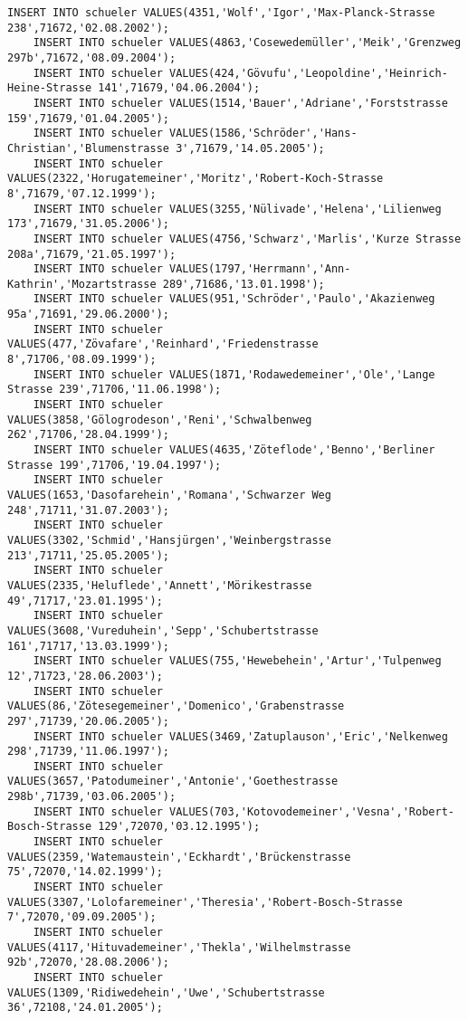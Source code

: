 \begin{lstlisting}[breaklines=True, numbers=none, basicstyle=\tiny, keepspaces=false]
	INSERT INTO schueler VALUES(4351,'Wolf','Igor','Max-Planck-Strasse 238',71672,'02.08.2002');
	INSERT INTO schueler VALUES(4863,'Cosewedemüller','Meik','Grenzweg 297b',71672,'08.09.2004');
	INSERT INTO schueler VALUES(424,'Gövufu','Leopoldine','Heinrich-Heine-Strasse 141',71679,'04.06.2004');
	INSERT INTO schueler VALUES(1514,'Bauer','Adriane','Forststrasse 159',71679,'01.04.2005');
	INSERT INTO schueler VALUES(1586,'Schröder','Hans-Christian','Blumenstrasse 3',71679,'14.05.2005');
	INSERT INTO schueler VALUES(2322,'Horugatemeiner','Moritz','Robert-Koch-Strasse 8',71679,'07.12.1999');
	INSERT INTO schueler VALUES(3255,'Nülivade','Helena','Lilienweg 173',71679,'31.05.2006');
	INSERT INTO schueler VALUES(4756,'Schwarz','Marlis','Kurze Strasse 208a',71679,'21.05.1997');
	INSERT INTO schueler VALUES(1797,'Herrmann','Ann-Kathrin','Mozartstrasse 289',71686,'13.01.1998');
	INSERT INTO schueler VALUES(951,'Schröder','Paulo','Akazienweg 95a',71691,'29.06.2000');
	INSERT INTO schueler VALUES(477,'Zövafare','Reinhard','Friedenstrasse 8',71706,'08.09.1999');
	INSERT INTO schueler VALUES(1871,'Rodawedemeiner','Ole','Lange Strasse 239',71706,'11.06.1998');
	INSERT INTO schueler VALUES(3858,'Gölogrodeson','Reni','Schwalbenweg 262',71706,'28.04.1999');
	INSERT INTO schueler VALUES(4635,'Zöteflode','Benno','Berliner Strasse 199',71706,'19.04.1997');
	INSERT INTO schueler VALUES(1653,'Dasofarehein','Romana','Schwarzer Weg 248',71711,'31.07.2003');
	INSERT INTO schueler VALUES(3302,'Schmid','Hansjürgen','Weinbergstrasse 213',71711,'25.05.2005');
	INSERT INTO schueler VALUES(2335,'Heluflede','Annett','Mörikestrasse 49',71717,'23.01.1995');
	INSERT INTO schueler VALUES(3608,'Vureduhein','Sepp','Schubertstrasse 161',71717,'13.03.1999');
	INSERT INTO schueler VALUES(755,'Hewebehein','Artur','Tulpenweg 12',71723,'28.06.2003');
	INSERT INTO schueler VALUES(86,'Zötesegemeiner','Domenico','Grabenstrasse 297',71739,'20.06.2005');
	INSERT INTO schueler VALUES(3469,'Zatuplauson','Eric','Nelkenweg 298',71739,'11.06.1997');
	INSERT INTO schueler VALUES(3657,'Patodumeiner','Antonie','Goethestrasse 298b',71739,'03.06.2005');
	INSERT INTO schueler VALUES(703,'Kotovodemeiner','Vesna','Robert-Bosch-Strasse 129',72070,'03.12.1995');
	INSERT INTO schueler VALUES(2359,'Watemaustein','Eckhardt','Brückenstrasse 75',72070,'14.02.1999');
	INSERT INTO schueler VALUES(3307,'Lolofaremeiner','Theresia','Robert-Bosch-Strasse 7',72070,'09.09.2005');
	INSERT INTO schueler VALUES(4117,'Hituvademeiner','Thekla','Wilhelmstrasse 92b',72070,'28.08.2006');
	INSERT INTO schueler VALUES(1309,'Ridiwedehein','Uwe','Schubertstrasse 36',72108,'24.01.2005');

\end{lstlisting}

